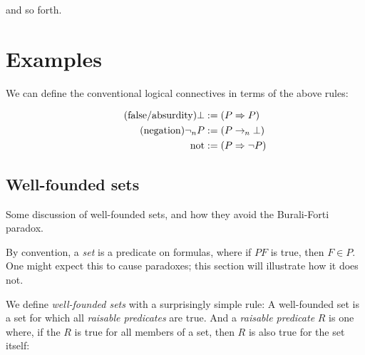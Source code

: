 \documentclass{article}
\begin{document}
  and so forth.

  \section{Examples}\label{structure}

  We can define the conventional logical connectives in terms of the above rules:

  \setlength{\jot}{0.4em}
  \begin{align*}
    \tag{false/absurdity}
    \bot &:= (P \Rightarrow{P})\\
    \tag{negation}
    \neg_{n} P &:= ({P \rightarrow_{\hspace{-0.04em}n} \bot})\\
    \mathrm{not} &:= (P \Rightarrow \neg P)\\
  \end{align*}

\iffalse
  \subsection{Well-founded sets}

  Some discussion of well-founded sets, and how they avoid the Burali-Forti paradox.

  By convention, a \emph{set} is a predicate on formulas, where if $PF$ is true, then $F \in P$. One might expect this to cause paradoxes; this section will illustrate how it does not.

  We define \emph{well-founded sets} with a surprisingly simple rule: A well-founded set is a set for which all \emph{raisable predicates} are true. And a \emph{raisable predicate} $R$ is one where, if the $R$ is true for all members of a set, then $R$ is also true for the set itself:
\end{document}
